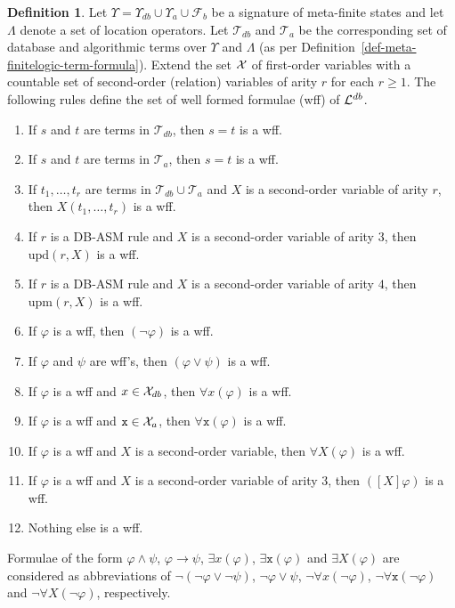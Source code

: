 \documentclass[preprint,11pt]{elsarticle}
\theoremstyle{definition}
\newtheorem{definition}{Definition}[section]
\theoremstyle{remark}
\begin{document}
\begin{definition}\label{def:logicsyntaxformulae}
Let $\Upsilon=\Upsilon_{db}\cup\Upsilon_a\cup\mathcal{F}_b$ be a
signature of meta-finite states and let $\Lambda$ denote a set of location operators. Let $\mathcal{T}_{db}$ and $\mathcal{T}_{a}$ be the corresponding set of database and algorithmic terms over $\Upsilon$ and $\Lambda$ (as per Definition~\ref{def-meta-finitelogic-term-formula}). Extend the set $\cal X$ of first-order variables with a countable set of second-order (relation) variables of arity $r$ for each $r \geq 1$. 
The following rules define the set of well formed formulae (wff) of ${\cal L}^{db}$.
\begin{enumerate}
\item If $s$ and $t$ are terms in $\mathcal{T}_{db}$, then $s=t$ is a wff.
\item If $s$ and $t$ are terms in $\mathcal{T}_{a}$, then $s=t$ is a wff.
\item If $t_1, \ldots, t_r$ are terms in $\mathcal{T}_{db} \cup \mathcal{T}_{a}$ and $X$ is a second-order variable of arity $r$, then $X(t_1, \ldots, t_r)$ is a wff.
\item If $r$ is a DB-ASM rule and $X$ is a second-order variable of arity $3$, then $\textrm{upd}(r, X)$ is a wff.
\item If $r$ is a DB-ASM rule and $X$ is a second-order variable of arity $4$, then $\textrm{upm}(r,X)$ is a wff.
\item If $\varphi$ is a wff, then $(\neg \varphi)$ is a wff.
\item If $\varphi$ and $\psi$ are wff's, then $(\varphi \vee \psi)$ is a wff.
\item If $\varphi$ is a wff and $x \in {\cal X}_{db}$, then $\forall x (\varphi)$ is a wff.
\item If $\varphi$ is a wff and $\mathtt{x} \in {\cal X}_{a}$, then $\forall \mathtt{x} (\varphi)$ is a wff.
\item If $\varphi$ is a wff and $X$ is a second-order variable, then $\forall X (\varphi)$ is a wff.
\item If $\varphi$ is a wff and $X$ is a second-order variable of arity $3$, then $([X]\varphi)$ is a wff.
\item Nothing else is a wff.  
\end{enumerate}
\end{definition}

Formulae of the form $\varphi \wedge \psi$, $\varphi \rightarrow \psi$, $\exists x (\varphi)$, $\exists \mathtt{x} (\varphi)$ and $\exists X (\varphi)$ are considered as abbreviations of $\neg (\neg \varphi \vee \neg \psi)$, $\neg \varphi \vee \psi$, $\neg \forall x (\neg \varphi)$, $\neg \forall \mathtt{x} (\neg \varphi)$ and $\neg \forall X (\neg \varphi)$, respectively. 
\end{document}

